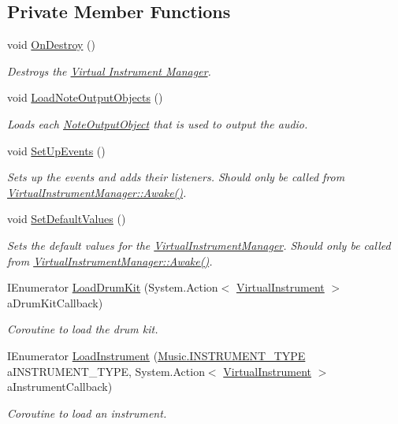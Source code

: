 \subsection*{Private Member Functions}
\begin{DoxyCompactItemize}
\item 
void \hyperlink{group___v_i_m_unity_ga87f2b8783dc03eac75819c3ace35f880}{On\+Destroy} ()
\begin{DoxyCompactList}\small\item\em Destroys the \hyperlink{group___v_i_m}{Virtual Instrument Manager}. \end{DoxyCompactList}\item 
void \hyperlink{group___v_i_m_priv_func_ga8817e32cc5074737b4d9489922b0fcb8}{Load\+Note\+Output\+Objects} ()
\begin{DoxyCompactList}\small\item\em Loads each \hyperlink{class_note_output_object}{Note\+Output\+Object} that is used to output the audio. \end{DoxyCompactList}\item 
void \hyperlink{group___v_i_m_priv_func_gaa207d18111d38374017c580de4077589}{Set\+Up\+Events} ()
\begin{DoxyCompactList}\small\item\em Sets up the events and adds their listeners. Should only be called from \hyperlink{group___v_i_m_unity_gab92bac4e22476ffe39fc40f49fbd6ae5}{Virtual\+Instrument\+Manager\+::\+Awake()}. \end{DoxyCompactList}\item 
void \hyperlink{group___v_i_m_priv_func_gaa9e05e51f025afb0ab5cb2a8532c8bba}{Set\+Default\+Values} ()
\begin{DoxyCompactList}\small\item\em Sets the default values for the \hyperlink{class_virtual_instrument_manager}{Virtual\+Instrument\+Manager}. Should only be called from \hyperlink{group___v_i_m_unity_gab92bac4e22476ffe39fc40f49fbd6ae5}{Virtual\+Instrument\+Manager\+::\+Awake()}. \end{DoxyCompactList}\item 
I\+Enumerator \hyperlink{group___v_i_m_coroutines_gaba165ca4757b6c8555914fe6b42b638d}{Load\+Drum\+Kit} (System.\+Action$<$ \hyperlink{class_virtual_instrument}{Virtual\+Instrument} $>$ a\+Drum\+Kit\+Callback)
\begin{DoxyCompactList}\small\item\em Coroutine to load the drum kit. \end{DoxyCompactList}\item 
I\+Enumerator \hyperlink{group___v_i_m_coroutines_gab8082c1cc590771bf57da8b5ae8603d1}{Load\+Instrument} (\hyperlink{group___music_enums_gabfce60192305965558a36e368ebd67c3}{Music.\+I\+N\+S\+T\+R\+U\+M\+E\+N\+T\+\_\+\+T\+Y\+PE} a\+I\+N\+S\+T\+R\+U\+M\+E\+N\+T\+\_\+\+T\+Y\+PE, System.\+Action$<$ \hyperlink{class_virtual_instrument}{Virtual\+Instrument} $>$ a\+Instrument\+Callback)
\begin{DoxyCompactList}\small\item\em Coroutine to load an instrument. \end{DoxyCompactList}\end{DoxyCompactItemize}
